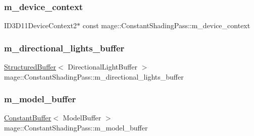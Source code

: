 \subsubsection{\texorpdfstring{m\+\_\+device\+\_\+context}{m\_device\_context}}
{\footnotesize\ttfamily I\+D3\+D11\+Device\+Context2$\ast$ const mage\+::\+Constant\+Shading\+Pass\+::m\+\_\+device\+\_\+context\hspace{0.3cm}{\ttfamily [private]}}

\hypertarget{classmage_1_1_constant_shading_pass_aa4851a004cdbb4f30bfdb3f48cd62bca}{}\label{classmage_1_1_constant_shading_pass_aa4851a004cdbb4f30bfdb3f48cd62bca} 
\subsubsection{\texorpdfstring{m\+\_\+directional\+\_\+lights\+\_\+buffer}{m\_directional\_lights\_buffer}}
{\footnotesize\ttfamily \hyperlink{structmage_1_1_structured_buffer}{Structured\+Buffer}$<$ Directional\+Light\+Buffer $>$ mage\+::\+Constant\+Shading\+Pass\+::m\+\_\+directional\+\_\+lights\+\_\+buffer\hspace{0.3cm}{\ttfamily [private]}}

\hypertarget{classmage_1_1_constant_shading_pass_ae828b9ae1e4cd281f346aca0db34c015}{}\label{classmage_1_1_constant_shading_pass_ae828b9ae1e4cd281f346aca0db34c015} 
\subsubsection{\texorpdfstring{m\+\_\+model\+\_\+buffer}{m\_model\_buffer}}
{\footnotesize\ttfamily \hyperlink{structmage_1_1_constant_buffer}{Constant\+Buffer}$<$ Model\+Buffer $>$ mage\+::\+Constant\+Shading\+Pass\+::m\+\_\+model\+\_\+buffer\hspace{0.3cm}{\ttfamily [private]}}

\hypertarget{classmage_1_1_constant_shading_pass_a6223b4fc31add5a57e9cc7f9d6d4ef60}{}\label{classmage_1_1_constant_shading_pass_a6223b4fc31add5a57e9cc7f9d6d4ef60} 
